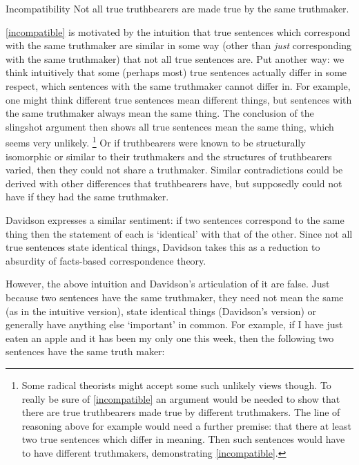	\begin{principle}{Incompatibility}\label{incompatible}
	Not all true truthbearers are made true by the same truthmaker.
	\end{principle}

\ref{incompatible} is motivated by the intuition that true sentences which correspond with the same truthmaker are similar in some way (other than \emph{just} corresponding with the same truthmaker) that not all true sentences are.
Put another way: we think intuitively that some (perhaps most) true sentences actually differ in some respect, which sentences with the same truthmaker cannot differ in.
For example, one might think different true sentences mean different things, but sentences with the same truthmaker always mean the same thing.
The conclusion of the slingshot argument then shows all true sentences mean the same thing, which seems very unlikely.
\footnote{Some radical theorists might accept some such unlikely views though.
To really be sure of \ref{incompatible} an argument would be needed to show that there are true truthbearers made true by different truthmakers.
The line of reasoning above for example would need a further premise: that there at least two true sentences which differ in meaning.
Then such sentences would have to have different truthmakers, demonstrating \ref{incompatible}.
}
Or if truthbearers were known to be structurally isomorphic or similar to their truthmakers and the structures of truthbearers varied, then they could not share a truthmaker.
Similar contradictions could be derived with other differences that truthbearers have, but supposedly could not have if they had the same truthmaker.

Davidson expresses a similar sentiment: if two sentences correspond to the same thing then the statement of each is `identical' with that of the other.
Since not all true sentences state identical things, Davidson takes this as a reduction to absurdity of facts-based correspondence theory.
\parencite[750]{Davidson_1969}

However, the above intuition and Davidson's articulation of it are false.
Just because two sentences have the same truthmaker, they need not mean the same (as in the intuitive version), state identical things (Davidson's version) or generally have anything else `important' in common.
For example, if I have just eaten an apple and it has been my only one this week, then the following two sentences have the same truth maker:

